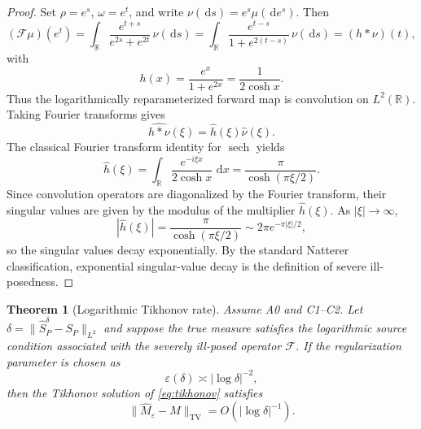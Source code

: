 \documentclass[11pt]{article}
\newtheorem{theorem}{Theorem}[section]
\newcommand{\R}{\mathbb{R}}
\newcommand{\TV}{\operatorname{TV}}
\newcommand{\dd}{\,\mathrm{d}}
\newcommand{\REV}{}
\begin{document}
\begin{proof}
\REV
Set $\rho=e^s$, $\omega=e^t$, and write $\nu(\dd s)=e^s\mu(\dd e^s)$. Then
\[
  (\mathcal F\mu)(e^t)
  =
  \int_{\R}\frac{e^{t+s}}{e^{2s}+e^{2t}}\,\nu(\dd s)
  =
  \int_{\R}\frac{e^{t-s}}{1+e^{2(t-s)}}\,\nu(\dd s)
  =
  (h\ast \nu)(t),
\]
with
\[
  h(x)=\frac{e^x}{1+e^{2x}}=\frac{1}{2\cosh x}.
\]
Thus the logarithmically reparameterized forward map is convolution on $L^2(\R)$. Taking Fourier transforms gives
\[
  \widehat{h\ast \nu}(\xi)=\widehat h(\xi)\widehat \nu(\xi).
\]
The classical Fourier transform identity for $\operatorname{sech}$ yields
\[
  \widehat h(\xi)=\int_{\R}\frac{e^{-i\xi x}}{2\cosh x}\,\dd x=\frac{\pi}{\cosh(\pi \xi/2)}.
\]
Since convolution operators are diagonalized by the Fourier transform, their singular values are given by the modulus of the multiplier $\widehat h(\xi)$. As $|\xi|\to\infty$,
\[
  |\widehat h(\xi)|
  =
  \frac{\pi}{\cosh(\pi \xi/2)}
  \sim 2\pi e^{-\pi |\xi|/2},
\]
so the singular values decay exponentially. By the standard Natterer classification, exponential singular-value decay is the definition of severe ill-posedness.
\end{proof}

\begin{theorem}[Logarithmic Tikhonov rate]\label{thm:tikhonov-rate}\REV
Assume A0 and C1--C2. Let $\delta=\|\widehat{S}_P^\delta-S_P\|_{L^2}$ and suppose the true measure satisfies the logarithmic source condition associated with the severely ill-posed operator $\mathcal F$. If the regularization parameter is chosen as
\[
  \varepsilon(\delta)\asymp |\log \delta|^{-2},
\]
then the Tikhonov solution of \cref{eq:tikhonov} satisfies
\[
  \|\widehat M_\varepsilon-M\|_{\TV}=O\!\left(|\log \delta|^{-1}\right).
\]
\end{theorem}
\end{document}
